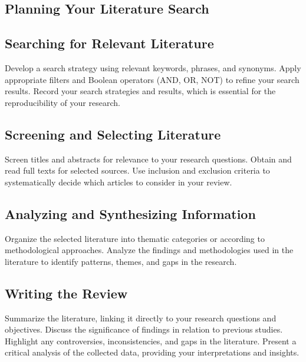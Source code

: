 \subsection{Planning Your Literature Search}

\subsection{Searching for Relevant Literature}
Develop a search strategy using relevant keywords, phrases, and synonyms. Apply appropriate filters and Boolean operators (AND, OR, NOT) to refine your search results. Record your search strategies and results, which is essential for the reproducibility of your research.

\subsection{Screening and Selecting Literature}
Screen titles and abstracts for relevance to your research questions. Obtain and read full texts for selected sources. Use inclusion and exclusion criteria to systematically decide which articles to consider in your review.

\subsection{Analyzing and Synthesizing Information}
Organize the selected literature into thematic categories or according to methodological approaches. Analyze the findings and methodologies used in the literature to identify patterns, themes, and gaps in the research.

\subsection{Writing the Review}
Summarize the literature, linking it directly to your research questions and objectives. Discuss the significance of findings in relation to previous studies. Highlight any controversies, inconsistencies, and gaps in the literature. Present a critical analysis of the collected data, providing your interpretations and insights.




